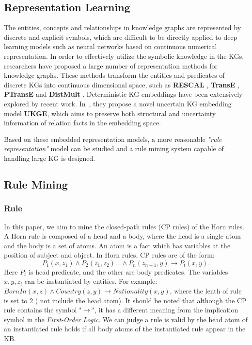 \documentclass{article}
\begin{document}
	\subsection{Representation Learning}
	The entities, concepts and relationships in knowledge graphs are represented by discrete and explicit symbols, which are difficult to be directly applied to deep learning models such as neural networks based on continuous numerical representation. 
	In order to effectively utilize the symbolic knowledge in the KGs, researchers have proposed a large number of representation methods for knowledge graphs. These methods transform the entities and predicates of discrete KGs into continuous dimensional space, such as {\bf RESCAL} \cite{Nickel:RESCAL}, {\bf TransE} \cite{Bordes:transe}, {\bf PTransE} \cite{Liu:ptranse} and {\bf DistMult} \cite{Yang:2015}. Deterministic KG embeddings have been extensively explored by recent work. In~\cite{UKG2018}, they propose a novel uncertain KG embedding model {\bf UKGE}, which aims to preserve both structural and uncertainty information of relation facts in the embedding space. 
	
	Based on these embedded representation models, a more reasonable {\em "rule representation"} model can be studied and a rule mining system capable of handling large KG is designed. 
	
	\subsection{Rule Mining}
	\subsubsection{Rule} In this paper, we aim to mine the closed-path rules (CP rules) of the Horn rules. A Horn rule is composed of a head and a body, where the head is a single atom and the body is a set of atoms. An atom is a fact which has variables at the position of subject and object. In Horn rules, CP rules are of the form: 
	\begin{equation} 
	P_1(x, z_1) \wedge P_2(z_1, z_2)... \wedge P_n(z_{n-1}, y) \to P_t(x, y). 
	 \label{eq:cp rule}
	\end{equation}
	Here $P_t$ is head predicate, and the other are body predicates. The variables $x, y, z_i$ can be instantiated by entities. For example: $BornIn(x, z) \wedge Country(z, y) \to Nationality(x, y)$, where the lenth of rule is set to 2 ( not include the head atom).
	It should be noted that although the CP rule contains the symbol "$\to$", it has a different meaning from the implication symbol in the {\em First-Order Logic}. We can judge a rule is valid by the head atom of an instantiated rule holds if all body atoms of the instantiated rule appear in the KB. 
	
\end{document}
